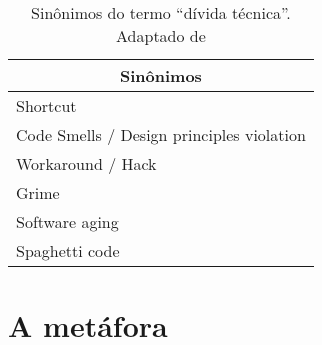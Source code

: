 \begin{table}[H]
\centering
\begin{tabular}{|l|}
\hline
\multicolumn{1}{|c|}{Sinônimos}                  \\ \hline
Shortcut                                   \\ \hline
Code Smells / Design principles violation                                \\ \hline
Workaround / Hack                          \\ \hline
Grime                                        \\ \hline
Software aging                                     \\ \hline
Spaghetti code                                        \\ \hline
\end{tabular}
\caption{Sinônimos do termo ``dívida técnica''. Adaptado de \cite{poliakov2015systematic}}
\label{tab:tabela_sinonimos}
\end{table}

\section{A metáfora}


